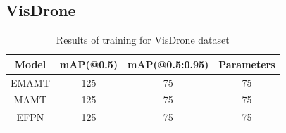 \subsection{VisDrone}
\begin{table}[h]
    \centering
    \begin{tabular}{|c|c|c|c|}
        \hline
        \textbf{Model}     & \textbf{mAP(@0.5)}     & \textbf{mAP(@0.5:0.95)}  & \textbf{Parameters}   \\ \hline
        EMAMT              & 125                    & 75                       & 75                    \\ \hline
        MAMT               & 125                    & 75                       & 75                    \\ \hline
        EFPN               & 125                    & 75                       & 75                    \\ \hline
    \end{tabular}
    \caption{Results of training for VisDrone dataset}
    \label{tab:vis_results}
\end{table}
